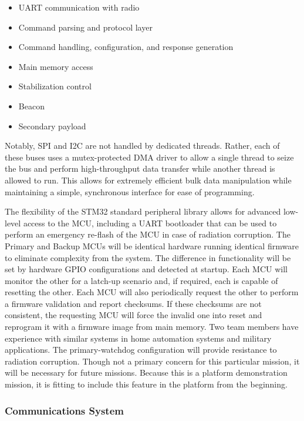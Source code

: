\documentclass[nocover]            %
{CSLI}                       %
\begin{document}
\begin{itemize}
\item UART communication with radio
\item Command parsing and protocol layer
\item Command handling, configuration, and response generation
\item Main memory access
\item Stabilization control
\item Beacon
\item Secondary payload
\end{itemize}


Notably, SPI and I2C are not handled by dedicated threads. Rather, each of these buses uses a mutex-protected DMA driver to allow a single thread to seize the bus and perform high-throughput data transfer while another thread is allowed to run. This allows for extremely efficient bulk data manipulation while maintaining a simple, synchronous interface for ease of programming.

The flexibility of the STM32 standard peripheral library allows for advanced low-level access to the MCU, including a UART bootloader that can be used to perform an emergency re-flash of the MCU in case of radiation corruption. The Primary and Backup MCUs will be identical hardware running identical firmware to eliminate complexity from the system. The difference in functionality will be set by hardware GPIO configurations and detected at startup. Each MCU will monitor the other for a latch-up scenario and, if required, each is capable of resetting the other. Each MCU will also periodically request the other to perform a firmware validation and report checksums. If these checksums are not consistent, the requesting MCU will force the invalid one into reset and reprogram it with a firmware image from main memory. Two team members have experience with similar systems in home automation systems and military applications. The primary-watchdog configuration will provide resistance to radiation corruption. Though not a primary concern for this particular mission, it will be necessary for future missions. Because this is a platform demonstration mission, it is fitting to include this feature in the platform from the beginning.

\subsubsection{Communications System}
\end{document}
